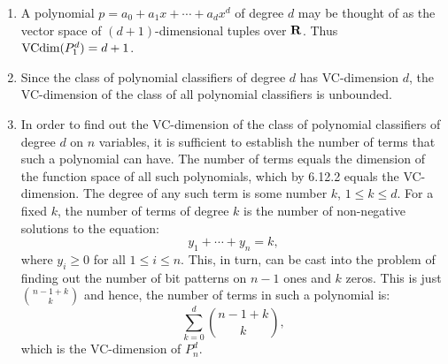 \begin{enumerate}
	\item A polynomial $p = a_0 + a_1 x + \cdots + a_d x^d$ of degree $d$
		 may be thought of as the vector space of $(d + 1)$-dimensional
		 tuples over $\mathbf{R}$. Thus $\text{VCdim} (P_1^d) = d + 1$.

	\item Since the class of polynomial classifiers of degree $d$ has VC-dimension
	$d$, the VC-dimension of the class of all polynomial classifiers is unbounded.

	\item In order to find out the VC-dimension of the class of polynomial classifiers
		of degree $d$ on $n$ variables, it is sufficient to establish the number
		of terms that such a polynomial can have. The number of terms equals
		the dimension of the function space of all such polynomials, which by 6.12.2
		equals the VC-dimension. The degree of
		any such term is some number $k$, $1 \leq k \leq d$. For a fixed $k$, the number
		of terms of degree $k$ is the number of non-negative solutions to the equation:
		\[
			y_1 + \cdots + y_n = k,
		\]
		where $y_i \geq 0$ for all $1 \leq i \leq n$.
		This, in turn, can be cast into the problem of finding out the number of bit patterns
		on $n - 1$ ones and $k$ zeros. This is just ${n - 1 + k \choose k}$ and hence, the
		number of terms in such a polynomial is:
		\[
			\sum_{k = 0}^{d} {n - 1 + k \choose k},
		\]
		which is the VC-dimension of $P_n^d$.

\end{enumerate}
